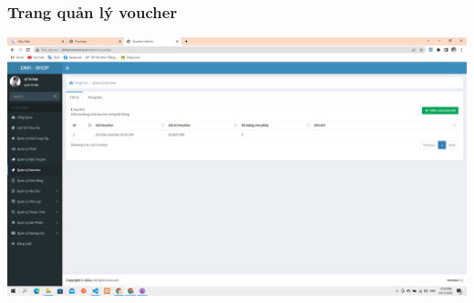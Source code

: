 \documentclass[12pt,a4paper,2sides]{report}
\begin{document}
\subsubsection{Trang quản lý voucher}
    \includegraphics[width=1\linewidth]{lib/results/quanlyvoucher.jpg}\\\vspace*{1cm}  
    \hspace{5cm}{Hình 47. Trang quản lý voucher}\\
\end{document}
